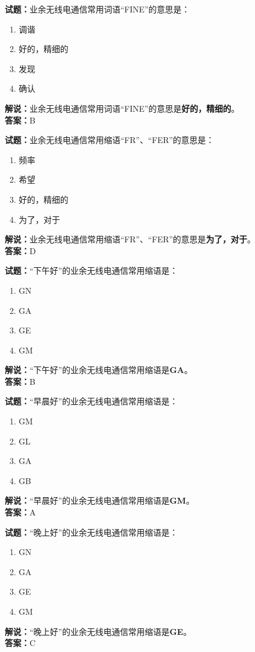 \documentclass{ctexbook}
\begin{document}
\bigskip


\noindent\textbf{试题：}业余无线电通信常用词语“FINE”的意思是：
\begin{enumerate}[leftmargin=3em]
\item 调谐
\item 好的，精细的
\item 发现
\item 确认
\end{enumerate}
\noindent\textbf{解说：}业余无线电通信常用词语“FINE”的意思是\textbf{好的，精细的}。\\\noindent\textbf{答案：}B
\bigskip


\noindent\textbf{试题：}业余无线电通信常用缩语“FR”、“FER”的意思是：
\begin{enumerate}[leftmargin=3em]
\item 频率
\item 希望
\item 好的，精细的
\item 为了，对于
\end{enumerate}
\noindent\textbf{解说：}业余无线电通信常用缩语“FR”、“FER”的意思是\textbf{为了，对于}。\\\noindent\textbf{答案：}D


\bigskip


\noindent\textbf{试题：}“下午好”的业余无线电通信常用缩语是：
\begin{enumerate}[leftmargin=3em]
\item GN
\item GA
\item GE
\item GM
\end{enumerate}
\noindent\textbf{解说：}“下午好”的业余无线电通信常用缩语是\textbf{GA}。\\\noindent\textbf{答案：}B

\bigskip


\noindent\textbf{试题：}“早晨好”的业余无线电通信常用缩语是：
\begin{enumerate}[leftmargin=3em]
\item GM
\item GL
\item GA
\item GB
\end{enumerate}
\noindent\textbf{解说：}“早晨好”的业余无线电通信常用缩语是\textbf{GM}。\\\noindent\textbf{答案：}A


\bigskip


\noindent\textbf{试题：}“晚上好”的业余无线电通信常用缩语是：
\begin{enumerate}[leftmargin=3em]
\item GN
\item GA
\item GE
\item GM
\end{enumerate}
\noindent\textbf{解说：}“晚上好”的业余无线电通信常用缩语是\textbf{GE}。\\\noindent\textbf{答案：}C
\end{document}
